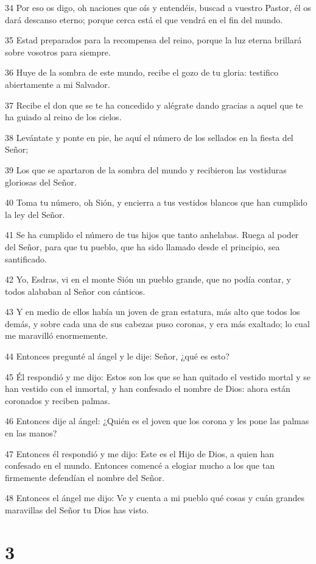 \par 34 Por eso os digo, oh naciones que oís y entendéis, buscad a vuestro Pastor, él os dará descanso eterno; porque cerca está el que vendrá en el fin del mundo.
\par 35 Estad preparados para la recompensa del reino, porque la luz eterna brillará sobre vosotros para siempre.
\par 36 Huye de la sombra de este mundo, recibe el gozo de tu gloria: testifico abiertamente a mi Salvador.
\par 37 Recibe el don que se te ha concedido y alégrate dando gracias a aquel que te ha guiado al reino de los cielos.
\par 38 Levántate y ponte en pie, he aquí el número de los sellados en la fiesta del Señor;
\par 39 Los que se apartaron de la sombra del mundo y recibieron las vestiduras gloriosas del Señor.
\par 40 Toma tu número, oh Sión, y encierra a tus vestidos blancos que han cumplido la ley del Señor.
\par 41 Se ha cumplido el número de tus hijos que tanto anhelabas. Ruega al poder del Señor, para que tu pueblo, que ha sido llamado desde el principio, sea santificado.
\par 42 Yo, Esdras, vi en el monte Sión un pueblo grande, que no podía contar, y todos alababan al Señor con cánticos.
\par 43 Y en medio de ellos había un joven de gran estatura, más alto que todos los demás, y sobre cada una de sus cabezas puso coronas, y era más exaltado; lo cual me maravilló enormemente.
\par 44 Entonces pregunté al ángel y le dije: Señor, ¿qué es esto?
\par 45 Él respondió y me dijo: Estos son los que se han quitado el vestido mortal y se han vestido con el inmortal, y han confesado el nombre de Dios: ahora están coronados y reciben palmas.
\par 46 Entonces dije al ángel: ¿Quién es el joven que los corona y les pone las palmas en las manos?
\par 47 Entonces él respondió y me dijo: Este es el Hijo de Dios, a quien han confesado en el mundo. Entonces comencé a elogiar mucho a los que tan firmemente defendían el nombre del Señor.
\par 48 Entonces el ángel me dijo: Ve y cuenta a mi pueblo qué cosas y cuán grandes maravillas del Señor tu Dios has visto.

\chapter{3}

